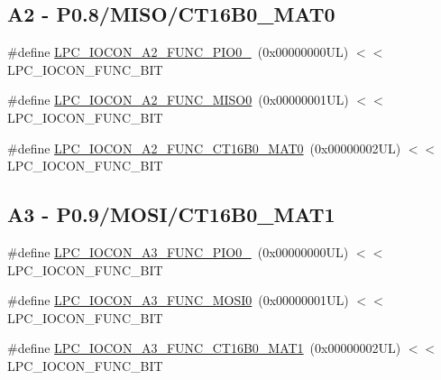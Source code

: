 \subsection*{A2 -\/ P0.8/\+M\+I\+S\+O/\+C\+T16\+B0\+\_\+\+M\+A\+T0}
\begin{DoxyCompactItemize}
\item 
\#define \hyperlink{group___l_p_c___i_o_c_o_n___l_p_c1102___p_i_n_e_s_ga73249c352adc2c4eb07089edf856904e}{L\+P\+C\+\_\+\+I\+O\+C\+O\+N\+\_\+\+A2\+\_\+\+F\+U\+N\+C\+\_\+\+P\+I\+O0\+\_}~(0x00000000\+U\+L) $<$$<$ L\+P\+C\+\_\+\+I\+O\+C\+O\+N\+\_\+\+F\+U\+N\+C\+\_\+\+B\+IT
\item 
\#define \hyperlink{group___l_p_c___i_o_c_o_n___l_p_c1102___p_i_n_e_s_gac2cf122fa3f708da105cdeba5c33215c}{L\+P\+C\+\_\+\+I\+O\+C\+O\+N\+\_\+\+A2\+\_\+\+F\+U\+N\+C\+\_\+\+M\+I\+S\+O0}~(0x00000001\+U\+L) $<$$<$ L\+P\+C\+\_\+\+I\+O\+C\+O\+N\+\_\+\+F\+U\+N\+C\+\_\+\+B\+IT
\item 
\#define \hyperlink{group___l_p_c___i_o_c_o_n___l_p_c1102___p_i_n_e_s_gae8b3d16d47cc34abc8668f6e5a9ef62b}{L\+P\+C\+\_\+\+I\+O\+C\+O\+N\+\_\+\+A2\+\_\+\+F\+U\+N\+C\+\_\+\+C\+T16\+B0\+\_\+\+M\+A\+T0}~(0x00000002\+U\+L) $<$$<$ L\+P\+C\+\_\+\+I\+O\+C\+O\+N\+\_\+\+F\+U\+N\+C\+\_\+\+B\+IT
\end{DoxyCompactItemize}
\subsection*{A3 -\/ P0.9/\+M\+O\+S\+I/\+C\+T16\+B0\+\_\+\+M\+A\+T1}
\begin{DoxyCompactItemize}
\item 
\#define \hyperlink{group___l_p_c___i_o_c_o_n___l_p_c1102___p_i_n_e_s_gab2f89db29fd04f6a1d1c3111cd3da9f2}{L\+P\+C\+\_\+\+I\+O\+C\+O\+N\+\_\+\+A3\+\_\+\+F\+U\+N\+C\+\_\+\+P\+I\+O0\+\_}~(0x00000000\+U\+L) $<$$<$ L\+P\+C\+\_\+\+I\+O\+C\+O\+N\+\_\+\+F\+U\+N\+C\+\_\+\+B\+IT
\item 
\#define \hyperlink{group___l_p_c___i_o_c_o_n___l_p_c1102___p_i_n_e_s_ga75592faa0d4e235173f790ee80e79651}{L\+P\+C\+\_\+\+I\+O\+C\+O\+N\+\_\+\+A3\+\_\+\+F\+U\+N\+C\+\_\+\+M\+O\+S\+I0}~(0x00000001\+U\+L) $<$$<$ L\+P\+C\+\_\+\+I\+O\+C\+O\+N\+\_\+\+F\+U\+N\+C\+\_\+\+B\+IT
\item 
\#define \hyperlink{group___l_p_c___i_o_c_o_n___l_p_c1102___p_i_n_e_s_gab8c36d6638e434a9db7d3e43e4a5e768}{L\+P\+C\+\_\+\+I\+O\+C\+O\+N\+\_\+\+A3\+\_\+\+F\+U\+N\+C\+\_\+\+C\+T16\+B0\+\_\+\+M\+A\+T1}~(0x00000002\+U\+L) $<$$<$ L\+P\+C\+\_\+\+I\+O\+C\+O\+N\+\_\+\+F\+U\+N\+C\+\_\+\+B\+IT
\end{DoxyCompactItemize}

